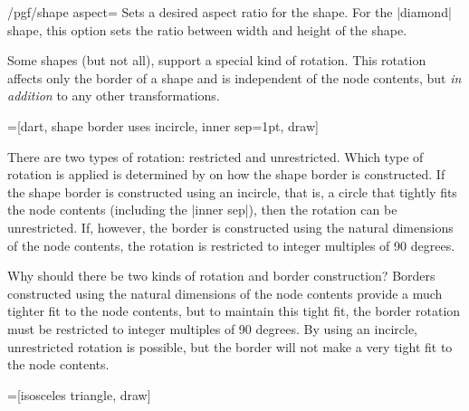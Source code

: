 \begin{key}{/pgf/shape aspect=}
  Sets a desired aspect ratio for the shape. For the |diamond| shape,
  this option sets the ratio between width and height of the shape.
\begin{codeexample}[]
\end{codeexample}
\end{key}

\label{section-rotating-shape-borders}

Some shapes (but not all), support a special kind of rotation. This
rotation affects only the border of a shape and is independent of the
node contents, but \emph{in addition} to any other transformations.
	
\begin{codeexample}[]
=[dart, shape border uses incircle,
  inner sep=1pt, draw]
\end{codeexample}

There are two types of rotation: restricted and unrestricted. Which
type of rotation is applied is determined by on how the shape border
is constructed. If the shape border is constructed using an incircle,
that is, a circle that tightly fits the node contents (including
the |inner sep|), then the rotation can be unrestricted. If, however,
the border is constructed using the natural dimensions of the node
contents, the rotation is restricted to integer multiples of 90
degrees.

Why should there be two kinds of rotation and border construction?
Borders constructed using the natural dimensions of the node contents
provide a much tighter fit to the node contents, but to maintain
this tight fit, the border rotation must be restricted to integer
multiples of 90 degrees. By using an incircle, unrestricted rotation
is possible, but the border will not make a very tight fit to the
node contents.
	
\begin{codeexample}[]
=[isosceles triangle, draw]
\end{codeexample}

